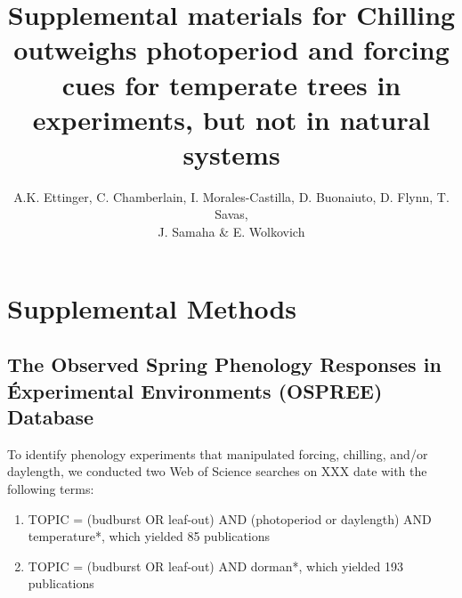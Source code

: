 \documentclass{article}
\begin{document}
\title{Supplemental materials  for Chilling outweighs photoperiod and forcing cues for temperate trees in experiments, but not in natural systems} %

\author{A.K. Ettinger, C. Chamberlain, I. Morales-Castilla, D. Buonaiuto, D. Flynn, T. Savas, \\J. Samaha \& E. Wolkovich}
\maketitle  %
\renewcommand{\thetable}{S\arabic{table}}
\renewcommand{\thefigure}{S\arabic{figure}}

\section*{Supplemental Methods}

\subsection*{The Observed Spring Phenology Responses in Éxperimental Environments (OSPREE) Database}
\par To identify phenology experiments that manipulated forcing, chilling, and/or daylength, we conducted two Web of Science searches on XXX date with the following terms: 
\begin{enumerate}
\item TOPIC = (budburst OR leaf-out) AND (photoperiod or daylength) AND temperature*, which yielded 85 publications

\item TOPIC = (budburst OR leaf-out) AND dorman*, which yielded 193 publications
\end{enumerate}
\end{document}
